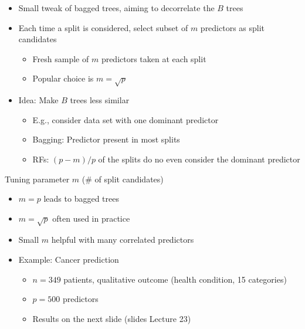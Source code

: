 \documentclass[11pt,a4paper,numbers=endperiod]{scrartcl}
\newcommand{\tit}[1]{\begin{large} \underline{\text{#1}}\end{large}}
\begin{document}
{\begin{itemize}
	\item Small tweak of bagged trees, aiming to decorrelate the $B$ trees
	\item Each time a split is considered, select subset of $m$ predictors as split candidates \begin{itemize}
		\item Fresh sample of $m$ predictors taken at each split
		\item Popular choice is $m = \sqrt{p}$
	\end{itemize}
	\item Idea: Make $B$ trees less similar \begin{itemize}
		\item E.g., consider data set with one dominant predictor
		\item Bagging: Predictor present in most splits
		\item  RFs: $(p-m)/p$ of the splits do no even consider the dominant predictor
	\end{itemize}
\end{itemize}

Tuning parameter $m$ (\# of split candidates) \begin{itemize}
	\item $m = p$ leads to bagged trees
	\item $m = \sqrt{p}$ often used in practice
	\item Small $m$ helpful with many correlated predictors
	\item Example: Cancer prediction \begin{itemize}
		\item $n = 349$ patients, qualitative outcome (health condition, 15 categories)
		\item $p = 500$ predictors
		\item Results on the next slide (slides Lecture 23) 
	\end{itemize}
\end{itemize}

\tit{Boosting}\\

}
\end{document}
